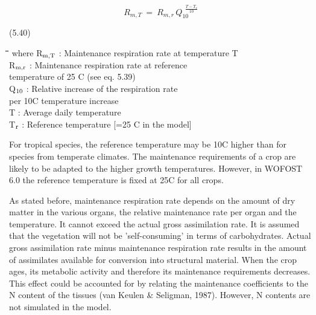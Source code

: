 \documentclass[11pt]{article}
\begin{document}
\begin{displaymath}
R _{m,T} ~=~ R _{m,r} \, Q _{10}^{~~{\frac{T-T _{r} }{10}} }
\end{displaymath}

 \bigskip
\strut\hfill (5.40)\\
\strut\hfill 
\nwln
\begin{tabbing}
\hspace{1.27cm}\=\hspace{1.27cm}\=\hspace{1.27cm}\=\hspace{1.27cm}\=%
\hspace{1.27cm}\=\hspace{1.27cm}\=\hspace{1.27cm}\=\hspace{1.27cm}\=%
\hspace{1.27cm}\=\hspace{1.27cm}\=\kill
where\> R$_{{\rm m,T}}$\> : Maintenance respiration rate at temperature T\> \> \> \> \> \> \> \> [kg ha$^{{\rm -1}}$ d$^{{\rm -1}}$]\\
\>R$_{{\rm m,r}}$\> : Maintenance respiration rate at reference \\
\>\>   temperature of 25 \degrees C (see eq. 5.39)\> \> \> \> \> \> \> \> [kg ha$^{{\rm -1}}$ d$^{{\rm -1}}$]\\
\>Q$_{{\rm 10}}$\> : Relative increase of the respiration rate\\
\>\>   per 10\degrees C temperature increase\> \> \> \> \> \> \> \> [-]\\
\>T\> : Average daily temperature \> \> \> \> \> \> \> \> [\degrees C]\\
\>T$_{{\rm r}}$\> : Reference temperature {\small [=25 \degrees C in the model]}\> \> \> \> \> \> \> \> [\degrees C]
\end{tabbing}

 \bigskip
For tropical species, the reference temperature may be 10\degrees C higher than for species from
temperate climates. The maintenance requirements of a crop are likely to be adapted to
the higher growth temperatures. However, in WOFOST 6.0 the reference temperature is
fixed at 25\degrees C for all crops.

\bigskip
\bigskip
As stated before, maintenance respiration rate depends on the amount of dry matter in the
various organs, the relative maintenance rate per organ and the temperature. It cannot
exceed the actual gross assimilation rate. It is assumed that the vegetation will not be
'self-consuming' in terms of carbohydrates. Actual gross assimilation rate minus mainten\-ance respiration rate results in the amount of assimilates available for conversion into
structural material. When the crop ages, its metabolic activity and therefore its mainten\-ance require\-ments decreases. This effect could be accounted for by relating the mainten\-ance coefficients to the N content of the tissues (van Keulen \& Seligman, 1987).
However, N contents are not simulated in the model. 
\end{document}
